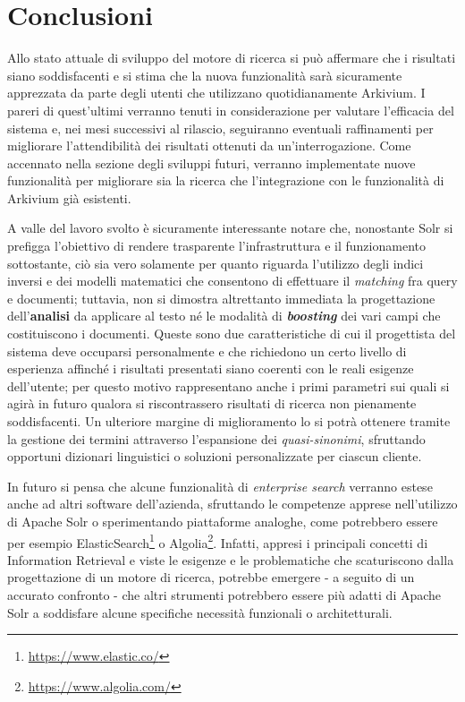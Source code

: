 
\chapter*{Conclusioni}

Allo stato attuale di sviluppo del motore di ricerca si può affermare che i risultati siano soddisfacenti e si stima che la nuova funzionalità sarà sicuramente apprezzata da parte degli utenti che utilizzano quotidianamente Arkivium. I pareri di quest’ultimi verranno tenuti in considerazione per valutare l’efficacia del sistema e, nei mesi successivi al rilascio, seguiranno eventuali raffinamenti per migliorare l’attendibilità dei risultati ottenuti da un'interrogazione. Come accennato nella sezione degli sviluppi futuri, verranno implementate nuove funzionalità per migliorare sia la ricerca che l’integrazione con le funzionalità di Arkivium già esistenti.

\vspace{1em}

A valle del lavoro svolto è sicuramente interessante notare che, nonostante Solr si prefigga l'obiettivo di rendere trasparente l’infrastruttura e il funzionamento sottostante, ciò sia vero solamente per quanto riguarda l’utilizzo degli indici inversi e dei modelli matematici che consentono di effettuare il \textit{matching} fra query e documenti; tuttavia, non si dimostra altrettanto immediata la progettazione dell’\textbf{analisi} da applicare al testo né le modalità di \textit{\textbf{boosting}} dei vari campi che costituiscono i documenti. Queste sono due caratteristiche di cui il progettista del sistema deve occuparsi personalmente e che richiedono un certo livello di esperienza affinché i risultati presentati siano coerenti con le reali esigenze dell’utente; per questo motivo rappresentano anche i primi parametri sui quali si agirà in futuro qualora si riscontrassero risultati di ricerca non pienamente soddisfacenti. Un ulteriore margine di miglioramento lo si potrà ottenere tramite la gestione dei termini attraverso l’espansione dei \textit{quasi-sinonimi}, sfruttando opportuni dizionari linguistici o soluzioni personalizzate per ciascun cliente.

\vspace{1em}

In futuro si pensa che alcune funzionalità di \textit{enterprise search} verranno estese anche ad altri software dell’azienda, sfruttando le competenze apprese nell’utilizzo di Apache Solr o sperimentando piattaforme analoghe, come potrebbero essere per esempio ElasticSearch\footnote{\url{https://www.elastic.co/}} o Algolia\footnote{\url{https://www.algolia.com/}}. Infatti, appresi i principali concetti di Information Retrieval e viste le esigenze e le problematiche che scaturiscono dalla progettazione di un motore di ricerca, potrebbe emergere - a seguito di un accurato confronto - che altri strumenti potrebbero essere più adatti di Apache Solr a soddisfare alcune specifiche necessità funzionali o architetturali.

